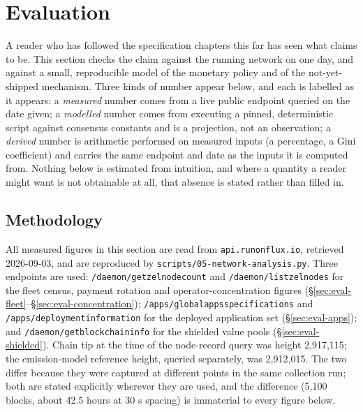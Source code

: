 \section{Evaluation}
\label{sec:evaluation}

A reader who has followed the specification chapters this far has seen what \Flux claims to be.
This section checks the claim against the running network on one day, and against a small,
reproducible model of the monetary policy and of the not-yet-shipped \PNR mechanism. Three kinds
of number appear below, and each is labelled as it appears: a \emph{measured} number comes from a
live public endpoint queried on the date given; a \emph{modelled} number comes from executing a
pinned, deterministic script against consensus constants and is a projection, not an observation;
a \emph{derived} number is arithmetic performed on measured inputs (a percentage, a Gini
coefficient) and carries the same endpoint and date as the inputs it is computed from. Nothing
below is estimated from intuition, and where a quantity a reader might want is not obtainable at
all, that absence is stated rather than filled in.

\subsection{Methodology}
\label{sec:eval-methodology}

All measured figures in this section are read from \texttt{api.\allowbreak{}runonflux.\allowbreak{}io}, retrieved
2026-09-03, and are reproduced by \texttt{scripts/\allowbreak{}05-network-analysis.\allowbreak{}py}. Three endpoints are
used: \texttt{/\allowbreak{}daemon/\allowbreak{}getzelnodecount} and \texttt{/\allowbreak{}daemon/\allowbreak{}listzelnodes} for the fleet census,
payment rotation and operator-concentration figures (\S\ref{sec:eval-fleet}--\S\ref{sec:eval-concentration});
\texttt{/\allowbreak{}apps/\allowbreak{}globalappsspecifications} and \texttt{/\allowbreak{}apps/\allowbreak{}deploymentinformation} for the deployed
application set (\S\ref{sec:eval-apps}); and \texttt{/\allowbreak{}daemon/\allowbreak{}getblockchaininfo} for the shielded
value pools (\S\ref{sec:eval-shielded}). Chain tip at the time of the node-record query was height
2,917,115; the emission-model reference height, queried separately, was 2,912,015. The two differ
because they were captured at different points in the same collection run; both are stated
explicitly wherever they are used, and the difference (5,100 blocks, about 42.5 hours at 30 s
spacing) is immaterial to every figure below.

